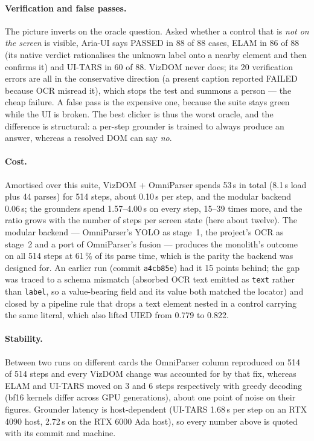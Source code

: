 \documentclass[11pt,a4paper]{article}
\newcommand{\code}[1]{\texttt{#1}}
\begin{document}
\paragraph{Verification and false passes.} The picture inverts on the oracle
question. Asked whether a control that is \emph{not on the screen} is visible,
Aria-UI says PASSED in 88 of 88 cases, ELAM in 86 of 88 (its native verdict
rationalises the unknown label onto a nearby element and then confirms it) and
UI-TARS in 60 of 88. VizDOM never does; its 20 verification errors are all in the
conservative direction (a present caption reported FAILED because OCR misread it),
which stops the test and summons a person --- the cheap failure. A false pass is the
expensive one, because the suite stays green while the UI is broken. The best clicker
is thus the worst oracle, and the difference is structural: a per-step grounder is
trained to always produce an answer, whereas a resolved DOM can say \emph{no}.

\paragraph{Cost.} Amortised over this suite, VizDOM + OmniParser spends 53\,s in
total (8.1\,s load plus 44 parses) for 514 steps, about 0.10\,s per step, and the
modular backend 0.06\,s; the grounders spend 1.57--4.00\,s on every step, 15--39
times more, and the ratio grows with the number of steps per screen state (here
about twelve). The modular backend --- OmniParser's YOLO as stage~1, the project's
OCR as stage~2 and a port of OmniParser's fusion --- produces the monolith's outcome
on all 514 steps at 61\,\% of its parse time, which is the parity the backend was
designed for. An earlier run (commit \code{a4cb85e}) had it 15 points behind; the
gap was traced to a schema mismatch (absorbed OCR text emitted as \code{text} rather
than \code{label}, so a value-bearing field and its value both matched the locator)
and closed by a pipeline rule that drops a text element nested in a control carrying
the same literal, which also lifted UIED from 0.779 to 0.822.

\paragraph{Stability.} Between two runs on different cards the OmniParser column
reproduced on 514 of 514 steps and every VizDOM change was accounted for by that
fix, whereas ELAM and UI-TARS moved on 3 and 6 steps respectively with greedy
decoding (bf16 kernels differ across GPU generations), about one point of noise on
their figures. Grounder latency is host-dependent (UI-TARS 1.68\,s per step on an RTX
4090 host, 2.72\,s on the RTX 6000 Ada host), so every number above is quoted with
its commit and machine.
\end{document}
